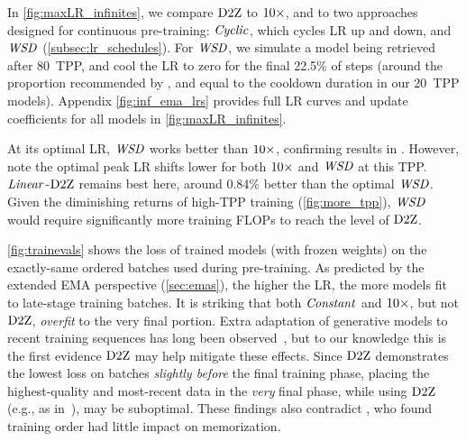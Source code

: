 In \cref{fig:maxLR_infinites}, we compare $\mbox{D2Z}$ to $\mbox{10}\times$, and to
two approaches designed for continuous pre-training: $\mbox{\emph{Cyclic}}$, which
cycles LR up and down, and $\mbox{\emph{WSD}}$ (\cref{subsec:lr_schedules}).  For
$\mbox{\emph{WSD}}$, we simulate a model being retrieved after 80~TPP, and cool the
LR to zero for the final 22.5\% of steps (around the proportion
recommended by \citet{hagele2024scaling}, and equal to the cooldown
duration in our 20~TPP models).  Appendix \cref{fig:inf_ema_lrs}
provides full LR curves and update coefficients for all models in
\cref{fig:maxLR_infinites}.

At its optimal LR, $\mbox{\emph{WSD}}$ works better than $\mbox{10}\times$, confirming
results in \citet{hagele2024scaling}.  However, note the optimal peak
LR shifts lower for both $\mbox{10}\times$ and $\mbox{\emph{WSD}}$ at this TPP\@.
%
$\mbox{\emph{Linear}}$-$\mbox{D2Z}$ remains best here, around 0.84\% better than the
optimal $\mbox{\emph{WSD}}$.  Given the diminishing returns of high-TPP training
(\cref{fig:more_tpp}), $\mbox{\emph{WSD}}$ would require significantly more
training FLOPs to reach the level of $\mbox{D2Z}$.


\cref{fig:trainevals} shows the loss of trained models (with frozen
weights) on the exactly-same ordered batches used during pre-training.
As predicted by the extended EMA perspective (\cref{sec:emas}), the
higher the LR, the more models fit to late-stage training batches.  It
is striking that both $\mbox{\emph{Constant}}$ and $\mbox{10}\times$, but not $\mbox{D2Z}$,
\emph{overfit} to the very final portion.  Extra adaptation of
generative models to recent training sequences has long been
observed~\citep{graves2013generating}, but to our knowledge this is
the first evidence $\mbox{D2Z}$ may help mitigate these effects.  Since
$\mbox{D2Z}$ demonstrates the lowest loss on batches \emph{slightly before}
the final training phase, placing the highest-quality and most-recent
data in the \emph{very} final phase, while using $\mbox{D2Z}$ (e.g., as
in~\citet{dubey2024llama}), may be suboptimal.
%
These findings also contradict \citet{biderman2023pythia}, who found
training order had little impact on memorization.

